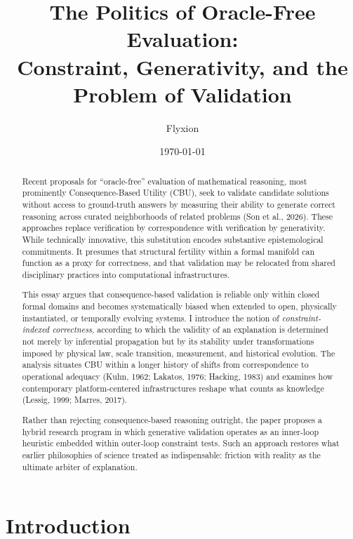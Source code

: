 \documentclass[11pt]{article}
\title{The Politics of Oracle-Free Evaluation:\\
Constraint, Generativity, and the Problem of Validation}
\author{Flyxion}
\date{\today}
\begin{document}
\maketitle

\begin{abstract}

Recent proposals for ``oracle-free'' evaluation of mathematical reasoning, most prominently Consequence-Based Utility (CBU), seek to validate candidate solutions without access to ground-truth answers by measuring their ability to generate correct reasoning across curated neighborhoods of related problems (Son et al., 2026). These approaches replace verification by correspondence with verification by generativity. While technically innovative, this substitution encodes substantive epistemological commitments. It presumes that structural fertility within a formal manifold can function as a proxy for correctness, and that validation may be relocated from shared disciplinary practices into computational infrastructures.

This essay argues that consequence-based validation is reliable only within closed formal domains and becomes systematically biased when extended to open, physically instantiated, or temporally evolving systems. I introduce the notion of \emph{constraint-indexed correctness}, according to which the validity of an explanation is determined not merely by inferential propagation but by its stability under transformations imposed by physical law, scale transition, measurement, and historical evolution. The analysis situates CBU within a longer history of shifts from correspondence to operational adequacy (Kuhn, 1962; Lakatos, 1976; Hacking, 1983) and examines how contemporary platform-centered infrastructures reshape what counts as knowledge (Lessig, 1999; Marres, 2017).

Rather than rejecting consequence-based reasoning outright, the paper proposes a hybrid research program in which generative validation operates as an inner-loop heuristic embedded within outer-loop constraint tests. Such an approach restores what earlier philosophies of science treated as indispensable: friction with reality as the ultimate arbiter of explanation.

\end{abstract}

\newpage
\section{Introduction}
\end{document}
